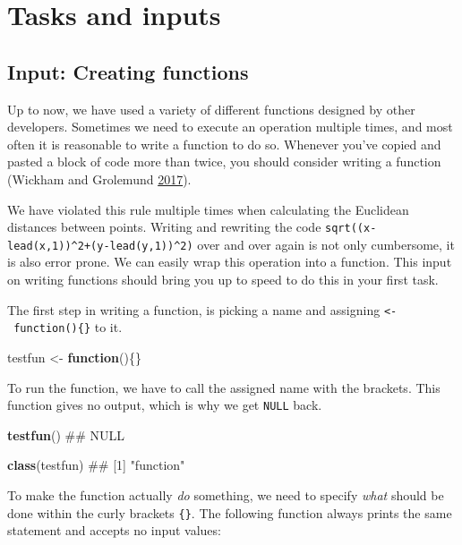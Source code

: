 \documentclass[]{book}
\newenvironment{Shaded}{\begin{snugshade}}{\end{snugshade}}
\newcommand{\KeywordTok}[1]{\textcolor[rgb]{0.13,0.29,0.53}{\textbf{#1}}}
\newcommand{\StringTok}[1]{\textcolor[rgb]{0.31,0.60,0.02}{#1}}
\newcommand{\ControlFlowTok}[1]{\textcolor[rgb]{0.13,0.29,0.53}{\textbf{#1}}}
\newcommand{\NormalTok}[1]{#1}
\begin{document}
\section{Tasks and inputs}\label{tasks-and-inputs-3}

\subsection{Input: Creating functions}\label{input-creating-functions}

Up to now, we have used a variety of different functions designed by
other developers. Sometimes we need to execute an operation multiple
times, and most often it is reasonable to write a function to do so.
Whenever you've copied and pasted a block of code more than twice, you
should consider writing a function (Wickham and Grolemund
\protect\hyperlink{ref-wickham2017}{2017}).

We have violated this rule multiple times when calculating the Euclidean
distances between points. Writing and rewriting the code
\texttt{sqrt((x-lead(x,1))\^{}2+(y-lead(y,1))\^{}2)} over and over again
is not only cumbersome, it is also error prone. We can easily wrap this
operation into a function. This input on writing functions should bring
you up to speed to do this in your first task.

The first step in writing a function, is picking a name and assigning
\texttt{\textless{}-\ function()\{\}} to it.

\begin{Shaded}
\begin{Highlighting}[]
\NormalTok{testfun <-}\StringTok{ }\ControlFlowTok{function}\NormalTok{()\{\}}
\end{Highlighting}
\end{Shaded}

To run the function, we have to call the assigned name with the
brackets. This function gives no output, which is why we get
\texttt{NULL} back.

\begin{Shaded}
\begin{Highlighting}[]
\KeywordTok{testfun}\NormalTok{()}
\NormalTok{## NULL}

\KeywordTok{class}\NormalTok{(testfun)}
\NormalTok{## [1] "function"}
\end{Highlighting}
\end{Shaded}

To make the function actually \emph{do} something, we need to specify
\emph{what} should be done within the curly brackets \texttt{\{\}}. The
following function always prints the same statement and accepts no input
values:
\end{document}
